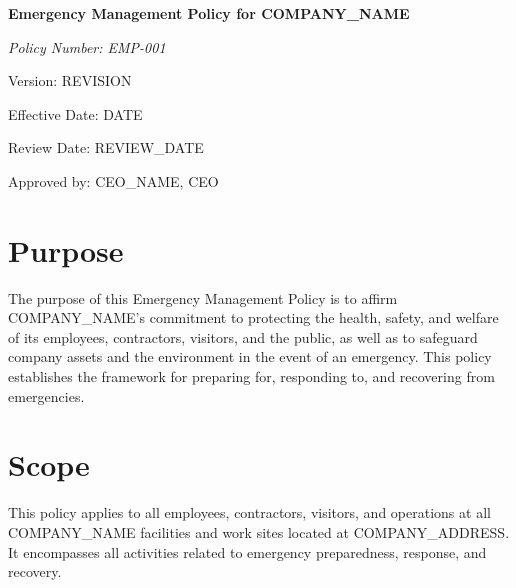 \documentclass[12pt]{article}
\begin{document}
\begin{titlepage}
    \centering
    \vspace*{2cm}
    {\LARGE\bfseries Emergency Management Policy for {{COMPANY_NAME}}\par}
    \vspace{1cm}
    {\large\itshape Policy Number: EMP-001\par}
    \vspace{0.5cm}
    {\normalsize Version: {{REVISION}}\par}
    \vspace{0.5cm}
    {\normalsize Effective Date: {{DATE}}\par}
    \vspace{0.5cm}
    {\normalsize Review Date: {{REVIEW_DATE}}\par}
    \vspace{2cm}
    {\normalsize Approved by: {{CEO_NAME}}, CEO\par}
\end{titlepage}

\section{Purpose}
The purpose of this Emergency Management Policy is to affirm {{COMPANY_NAME}}'s commitment to protecting the health, safety, and welfare of its employees, contractors, visitors, and the public, as well as to safeguard company assets and the environment in the event of an emergency. This policy establishes the framework for preparing for, responding to, and recovering from emergencies.

\section{Scope}
This policy applies to all employees, contractors, visitors, and operations at all {{COMPANY_NAME}} facilities and work sites located at {{COMPANY_ADDRESS}}. It encompasses all activities related to emergency preparedness, response, and recovery.
\end{document}
